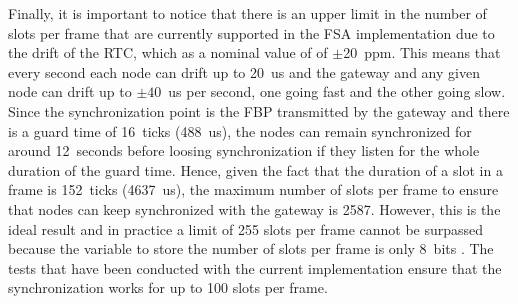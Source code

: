 Finally, it is important to notice that there is an upper limit in the number of slots per frame that are currently supported in the FSA implementation due to the drift of the RTC, which as a nominal value of of $\pm$20~ppm. This means that every second each node can drift up to 20~us and the gateway and any given node can drift up to $\pm40$~us per second, one going fast and the other going slow. Since the synchronization point is the FBP transmitted by the gateway and there is a guard time of 16~ticks (488~us), the nodes can remain synchronized for around 12~seconds before loosing synchronization if they listen for the whole duration of the guard time. Hence, given the fact that the duration of a slot in a frame is 152~ticks (4637~us), the maximum number of slots per frame to ensure that nodes can keep synchronized with the gateway is 2587. However, this is the ideal result and in practice a limit of 255 slots per frame cannot be surpassed because the variable to store the number of slots per frame is only 8~bits . The tests that have been conducted with the current implementation ensure that the synchronization works for up to 100 slots per frame.

